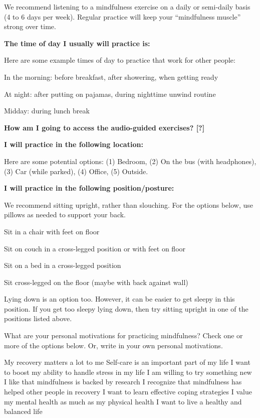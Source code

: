 	We recommend listening to a mindfulness exercise on a daily or semi-daily basis (4 to 6 days per week). Regular practice will keep your “mindfulness muscle” strong over time.

	\textbf{The time of day I usually will practice is: }

	Here are some example times of day to practice that work for other people:
	\begin{itemize*}
		\item In the morning: before breakfast, after showering, when getting ready
		\item At night: after putting on pajamas, during nighttime unwind routine
		\item Midday: during lunch break
	\end{itemize*}

	\textbf{How am I going to access the audio-guided exercises? [?]} 

	\textbf{I will practice in the following location:} 

	Here are some potential options: (1) Bedroom, (2) On the bus (with headphones), (3) Car (while parked), (4) Office, (5) Outside.

	\textbf{I will practice in the following position/posture:} 

	We recommend sitting upright, rather than slouching. For the options below, use pillows as needed to support your back.
	\begin{enumerate*}
		\item Sit in a chair with feet on floor
		\item Sit on couch in a cross-legged position or with feet on floor
		\item Sit on a bed in a cross-legged position
		\item Sit cross-legged on the floor (maybe with back against wall)
	\end{enumerate*}
	Lying down is an option too. However, it can be easier to get sleepy in this position. If you get too sleepy lying down, then try sitting upright in one of the positions listed above.


	What are your personal motivations for practicing mindfulness? Check one or more of the options below. Or, write in your own personal motivations.
	\begin{itemize}
		\itemSq My recovery matters a lot to me
		\itemSq Self-care is an important part of my life
		\itemSq I want to boost my ability to handle stress in my life
		\itemSq I am willing to try something new
		\itemSq I like that mindfulness is backed by research
		\itemSq I recognize that mindfulness has helped other people in recovery
		\itemSq I want to learn effective coping strategies
		\itemSq I value my mental health as much as my physical health
		\itemSq I want to live a healthy and balanced life
		\itemSq {}
		\itemSq {}
		\itemSq {}
	 \end{itemize}



